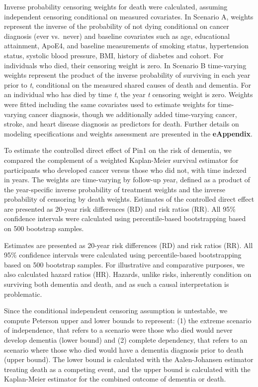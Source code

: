 \documentclass[
]{book}
\begin{document}
Inverse probability censoring weights for death were calculated, assuming independent censoring conditional on measured covariates. In Scenario A, weights represent the inverse of the probability of not dying conditional on cancer diagnosis (ever vs.~never) and baseline covariates such as age, educational attainment, ApoE4, and baseline measurements of smoking status, hypertension status, systolic blood pressure, BMI, history of diabetes and cohort. For individuals who died, their censoring weight is zero\autocite{whatif2020}. In Scenario B time-varying weights represent the product of the inverse probability of surviving in each year prior to \emph{t}, conditional on the measured shared causes of death and dementia. For an individual who has died by time \emph{t}, the year \emph{t} censoring weight is zero\autocite{young2020}. Weights were fitted including the same covariates used to estimate weights for time-varying cancer diagnosis, though we additionally added time-varying cancer, stroke, and heart disease diagnosis as predictors for death. Further details on modeling specifications and weights assessment are presented in the \textbf{eAppendix}.

To estimate the controlled direct effect of Pin1 on the risk of dementia, we compared the complement of a weighted Kaplan-Meier survival estimator for participants who developed cancer versus those who did not, with time indexed in years. The weights are time-varying by follow-up year, defined as a product of the year-specific inverse probability of treatment weights and the inverse probability of censoring by death weights. Estimates of the controlled direct effect are presented as 20-year risk differences (RD) and risk ratios (RR). All 95\% confidence intervals were calculated using percentile-based bootstrapping based on 500 bootstrap samples.

Estimates are presented as 20-year risk differences (RD) and risk ratios (RR). All 95\% confidence intervals were calculated using percentile-based bootstrapping based on 500 bootstrap samples. For illustrative and comparative purposes, we also calculated hazard ratios (HR). Hazards, unlike risks, inherently condition on surviving both dementia and death, and as such a causal interpretation is problematic\autocite{young2020}.

Since the conditional independent censoring assumption is untestable, we compute Peterson upper and lower bounds\autocite{peterson1976} to represent: (1) the extreme scenario of independence, that refers to a scenario were those who died would never develop dementia (lower bound) and (2) complete dependency, that refers to an scenario where those who died would have a dementia diagnosis prior to death (upper bound). The lower bound is calculated with the Aalen-Johansen estimator treating death as a competing event, and the upper bound is calculated with the Kaplan-Meier estimator for the combined outcome of dementia or death.
\end{document}
